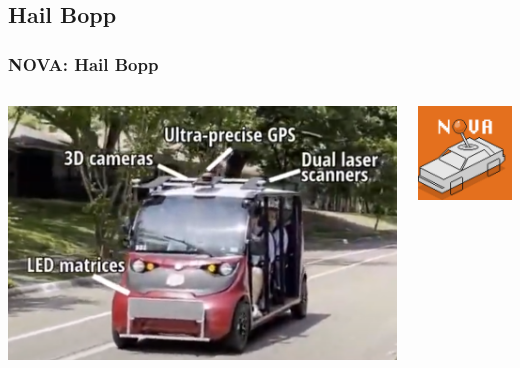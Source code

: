 \documentclass[aspectratio=169]{beamer}
\begin{document}
\subsection{Hail Bopp}
\begin{frame}
	\frametitle{NOVA: Hail Bopp \cite{nova}}
	\begin{columns}
		\begin{column}{0.5\textwidth}
			\includegraphics[width=\columnwidth]{figs/NOVA-annotatedImage.png}
		\end{column}
		\begin{column}{0.3\textwidth}
			\includegraphics[width=\columnwidth]{figs/NOVA-logo.png}
		\end{column}
	\end{columns}
\end{frame}
\end{document}
